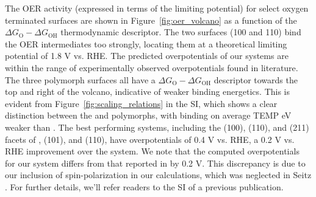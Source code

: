 The OER activity (expressed in terms of the limiting potential) for select oxygen terminated surfaces are shown in Figure~\ref{fig:oer_volcano} as a function of the $\Delta G_\mathrm{O} - \Delta G_\mathrm{OH}$ thermodynamic descriptor.
%
The two \rIrOtwo surfaces (100 and 110) bind the OER intermediates too strongly,
locating them at a theoretical limiting potential of \mytilde\num{1.8} V vs. RHE.
%
The predicted overpotentials of our \rIrOtwo systems are within the range of experimentally observed overpotentials found in literature.
%
The three \IrOthree polymorph surfaces all have a $\Delta G_\mathrm{O} - \Delta G_\mathrm{OH}$ descriptor towards the top and right of the volcano, indicative of weaker binding energetics.
%
This is evident from Figure~\ref{fig:scaling_relations} in the SI, which shows a clear distinction between the \IrOtwo and \IrOthree polymorphs, with \IrOthree binding on average TEMP eV weaker than \IrOtwo.
%
The best performing systems, including the (100), (110), and (211) facets of \aIrOthree, \bIrOthree (101), and \rIrOthree (110), have overpotentials of \mytilde\num{0.4} V vs. RHE,
a \mytilde\num{0.2} V vs. RHE improvement over the \rIrOtwo system.
%
We note that the computed  overpotentials for our \rIrOtwo system differs from that reported in \cite{Seitz2016} by \mytilde\num{0.2} V.
%
This discrepancy is due to our inclusion of spin-polarization in our  calculations, which was neglected in Seitz .
%
For further details, we'll refer readers to the SI of a previous publication.\cite{Strickler2019}


